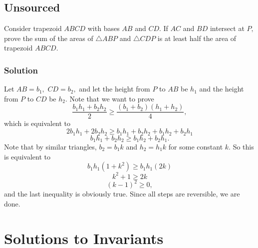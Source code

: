 \documentclass[blue,onecol]{shooting}
\begin{document}
\section{Unsourced}
Consider trapezoid $ABCD$ with bases $AB$ and $CD.$ If $AC$ and $BD$ intersect at $P,$ prove the sum of the areas of $\triangle ABP$ and $\triangle CDP$ is at least half the area of trapezoid $ABCD.$

\subsection{Solution}

Let $AB=b_1,$ $CD=b_2,$ and let the height from $P$ to $AB$ be $h_1$ and the height from $P$ to $CD$ be $h_2.$ Note that we want to prove
\[\frac{b_1h_1+b_2h_2}{2}\geq \frac{(b_1+b_2)(h_1+h_2)}{4},\]
which is equivalent to
\[2b_1h_1+2b_2h_2\geq b_1h_1+b_2h_2+b_1h_2+b_2h_1\]
\[b_1h_1+b_2h_2\geq b_1h_2+b_2h_1.\]
Note that by similar triangles, $b_2=b_1k$ and $h_2=h_1k$ for some constant $k.$ So this is equivalent to
\[b_1h_1(1+k^2)\geq b_1h_1(2k)\]
\[k^2+1\geq 2k\]
\[(k-1)^2\geq 0,\]
and the last inequality is obviously true. Since all steps are reversible, we are done.

\begin{center}
\end{center}


\chapter{Solutions to Invariants}
\end{document}

